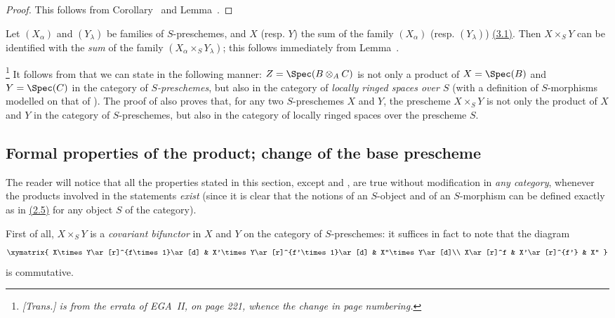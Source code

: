 \begin{proof}
This follows from Corollary~ and Lemma~.
\end{proof}

\begin{env}[3.2.8]
\label{I.3.2.8}
Let $(X_\alpha)$ and $(Y_\lambda)$ be families of $S$-preschemes, and $X$ (resp. $Y$) the sum
of the family $(X_\alpha)$ (resp. $(Y_\lambda)$) \hyperref[subsection:I.3.1]{(3.1)}.
Then $X\times_S Y$ can be identified with the \emph{sum} of the family $(X_\alpha\times_S Y_\lambda)$; this follows immediately from Lemma~.
\end{env}

\begin{env}[3.2.9]
\label{I.3.2.9}
\footnote{\emph{[Trans.]  is from the errata of EGA~II, on page 221, whence the change in page numbering.}}
It follows from  that we can state  in the following
manner: $Z=\Spec(B\otimes_A C)$ is not only a product of $X=\Spec(B)$ and $Y=\Spec(C)$ in the
category of \emph{$S$-preschemes}, but also in the category of \emph{locally ringed spaces
over $S$} (with a definition of $S$-morphisms modelled on that of ). The
proof of  also proves that, for any two $S$-preschemes $X$ and $Y$, the
prescheme $X\times_S Y$ is not only the product of $X$ and $Y$ in the category of
$S$-preschemes, but also in the category of locally ringed spaces over the prescheme $S$.
\end{env}

\subsection{Formal properties of the product; change of the base prescheme}
\label{subsection:I.3.3}

\begin{env}[3.3.1]
\label{I.3.3.1}
The reader will notice that all the properties stated in this section, except
 and , are true without modification in \emph{any
category}, whenever the products involved in the statements \emph{exist} (since it is
clear that the notions of an $S$-object and of an $S$-morphism can be defined
exactly as in \hyperref[subsection:I.2.5]{(2.5)} for any object $S$ of the category).
\end{env}

\begin{env}[3.3.2]
\label{I.3.3.2}
First of all, $X\times_S Y$ is a \emph{covariant bifunctor} in $X$ and $Y$ on the
category of $S$-preschemes: it suffices in fact to note that the diagram
\[
  \xymatrix{
    X\times Y\ar[r]^{f\times 1}\ar[d] &
    X'\times Y\ar[r]^{f'\times 1}\ar[d] &
    X''\times Y\ar[d]\\
    X\ar[r]^f &
    X'\ar[r]^{f'} &
    X''
  }
\]
is commutative.
\end{env}

